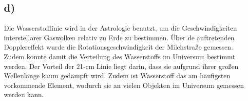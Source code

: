 \subsection{d)}

Die Wasserstofflinie wird in der Astrologie benutzt, um die Geschwindigkeiten 
interstellarer Gaswolken relativ zu Erde zu bestimmen. Über de auftretenden Dopplereffekt wurde
die Rotationsgeschwindigkeit der Milchstraße gemessen. Zudem konnte damit die
Verteilung des Wasserstoffs im Universum bestimmt werden. Der Vorteil der 
21-cm Linie liegt darin, dass sie aufgrund ihrer großen Wellenlänge kaum gedämpft wird.
Zudem ist Wasserstoff das am häufigsten vorkommende Element, wodurch sie an vielen
Objekten im Universum gemessen werden kann.


